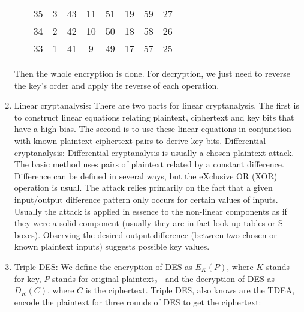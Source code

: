 \documentclass[12pt, a4paper]{article}
\begin{document}
\begin{enumerate}
\begin{enumerate}[a)]
\begin{center}
\begin{tabular}{cccccccc}
                                    35 & 3 & 43 & 11 & 51 & 19 & 59 & 27\\
                                    34 & 2 & 42 & 10 & 50 & 18 & 58 & 26\\
                                    33 & 1 & 41 & 9  & 49 & 17 & 57 & 25
                              \end{tabular}
                        \end{center}
            \end{enumerate}
            Then the whole encryption is done.\newline
            For decryption, we just need to reverse the key's order and apply the reverse of each operation.
      \item Linear cryptanalysis:\newline
            There are two parts for linear cryptanalysis. 
            The first is to construct linear equations relating plaintext, ciphertext and key bits that have a high bias. 
            The second is to use these linear equations in conjunction with known plaintext-ciphertext pairs to derive key bits.\newline
            \newline
            Differential cryptanalysis:\newline
            Differential cryptanalysis is usually a chosen plaintext attack. 
            The basic method uses pairs of plaintext related by a constant difference. 
            Difference can be defined in several ways, but the eXclusive OR (XOR) operation is usual.\newline
            The attack relies primarily on the fact that a given input/output difference pattern only occurs for certain values of inputs.
            Usually the attack is applied in essence to the non-linear components as if they were a solid component 
            (usually they are in fact look-up tables or S-boxes). Observing the desired output difference 
            (between two chosen or known plaintext inputs) suggests possible key values.
      \item Triple DES:\newline
            We define the encryption of DES as $E_K(P)$, where $K$ stands for key, $P$ stands for original plaintext， 
            and the decryption of DES as $D_K(C)$, where $C$ is the ciphertext.\newline
            Triple DES, also knows are the TDEA, encode the plaintext for three rounds of DES to get the ciphertext:

\end{enumerate}
\end{document}
